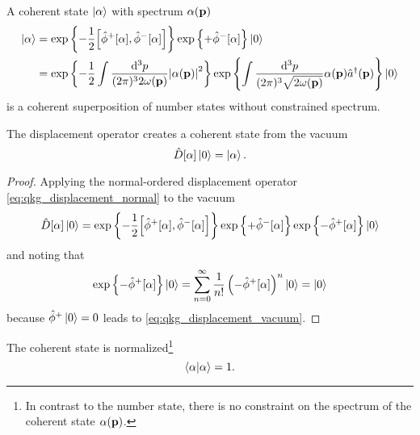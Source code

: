 \begin{definition}
	A coherent state $\ket{\alpha}$ with spectrum $\alpha(\vb{p})$
	\begin{equation}
		\begin{split}
			\ket{\alpha}
			&=
			\exp\left\{
				-
				\frac{1}{2}
				\comm{\hat\phi^+[\alpha]}{\hat\phi^-[\alpha]}
			\right\}
			\exp\left\{
				+\hat\phi^-[\alpha]
			\right\}
			\ket{0}
			\\
			&=
			\exp\left\{
				-
				\frac{1}{2}
				\int\frac{\dd[3]{p}}{(2\pi)^32\omega(\vb{p})}
				\abs{\alpha(\vb{p})}^2
			\right\}
			\exp\left\{
				\int\frac{\dd[3]{p}}{(2\pi)^3\sqrt{2\omega(\vb{p})}}
				\alpha(\vb{p})
				\hat{a}^\dagger(\vb{p})
			\right\}
			\ket{0}
		\end{split}
	\end{equation}
	is a coherent superposition of number states without constrained spectrum.
\end{definition}

\begin{lemma}\label{thm:qkg_displacement_vacuum}
	The displacement operator creates a coherent state from the vacuum
	\begin{equation}\label{eq:qkg_displacement_vacuum}
		\hat{D}[\alpha]
		\ket{0}
		=
		\ket{\alpha}
		.
	\end{equation}
\end{lemma}
\begin{proof}
	Applying the normal-ordered displacement operator \cref{eq:qkg_displacement_normal} to the vacuum
	\begin{equation*}
		\hat{D}[\alpha]
		\ket{0}
		=
		\exp\left\{
			-
			\frac{1}{2}
			\comm{\hat\phi^+[\alpha]}{\hat\phi^-[\alpha]}
		\right\}
		\exp\left\{
			+
			\hat\phi^-[\alpha]
		\right\}
		\exp\left\{
			-
			\hat\phi^+[\alpha]
		\right\}
		\ket{0}
	\end{equation*}
	and noting that
	\begin{equation*}
		\exp\left\{
			-
			\hat\phi^+[\alpha]
		\right\}
		\ket{0}
		=
		\sum_{n=0}^\infty
		\frac{1}{n!}
		\left(
			-
			\hat\phi^+[\alpha]
		\right)^n
		\ket{0}
		=
		\ket{0}
	\end{equation*}
	because $\hat\phi^+\ket{0}=0$ leads to \cref{eq:qkg_displacement_vacuum}.
\end{proof}

\begin{corollary}
	The coherent state is normalized\footnote{In contrast to the number state, there is no constraint on the spectrum of the coherent state $\alpha(\vb{p})$.}
	\begin{equation}
		\braket{\alpha}
		=
		1
		.
	\end{equation}
\end{corollary}

